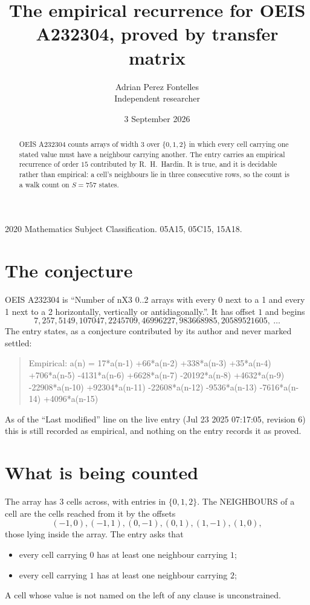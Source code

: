 \documentclass[11pt,a4paper]{article}
\title{The empirical recurrence for OEIS A232304, proved by transfer matrix}
\author{Adrian Perez Fontelles\\ \small Independent researcher}
\date{3 September 2026}
\theoremstyle{plain}
\theoremstyle{definition}
\begin{document}
\maketitle

\begin{abstract}
OEIS A232304 counts arrays of width $3$ over $\{0,1,2\}$ in which every cell carrying one stated
value must have a neighbour carrying another. The entry carries an empirical recurrence of
order $15$ contributed by R.~H.~Hardin. It is true, and it is decidable rather than
empirical: a cell's neighbours lie in three consecutive rows, so the count is a walk count on
$S=757$ states.
\end{abstract}

\noindent\small 2020 Mathematics Subject Classification. 05A15, 05C15, 15A18.\normalsize

\section{The conjecture}

OEIS A232304 is ``Number of nX3 0..2 arrays with every 0 next to a 1 and every 1 next to a 2 horizontally, vertically or antidiagonally.''. It has offset $1$ and begins
\[
7, 257, 5149, 107047, 2245709, 46996227, 983668985, 20589521605,\ \dots
\]
The entry states, as a conjecture contributed by its author and never marked settled:
\begin{quote}
Empirical: a(n) = 17*a(n-1) +66*a(n-2) +338*a(n-3) +35*a(n-4) +706*a(n-5) -4131*a(n-6) +6628*a(n-7) -20192*a(n-8) +4632*a(n-9) -22908*a(n-10) +92304*a(n-11) -22608*a(n-12) -9536*a(n-13) -7616*a(n-14) +4096*a(n-15)
\end{quote}
As of the ``Last modified'' line on the live entry (Jul 23 2025 07:17:05, revision 6) this is still
recorded as empirical, and nothing on the entry records it as proved.

\section{What is being counted}

The array has $3$ cells across, with entries in $\{0,1,2\}$. The NEIGHBOURS of a cell are the
cells reached from it by the offsets
\[
(-1,0), (-1,1), (0,-1), (0,1), (1,-1), (1,0),
\]
those lying inside the array. The entry asks that
\begin{itemize}
\item every cell carrying $0$ has at least one neighbour carrying $1$;
\item every cell carrying $1$ has at least one neighbour carrying $2$;

\end{itemize}
A cell whose value is not named on the left of any clause is unconstrained.
\end{document}
